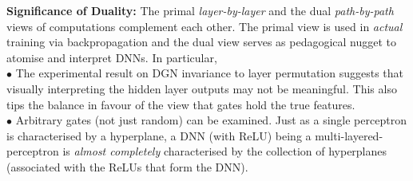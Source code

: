 \textbf{Significance of Duality:} The primal \emph{layer-by-layer} and the dual \emph{path-by-path} views of computations complement each other. The primal view is used in \emph{actual} training via backpropagation and the dual view serves as pedagogical nugget to atomise and interpret DNNs. In particular,\\
$\bullet$ The experimental result on DGN invariance to layer permutation suggests that visually interpreting the hidden layer outputs may not be meaningful. This also tips the balance in favour of the view that gates hold the true features.\\
$\bullet$ Arbitrary gates (not just random) can be examined. Just as a single perceptron is characterised by a hyperplane, a DNN (with ReLU) being a multi-layered-perceptron is \emph{almost completely} characterised by the collection of hyperplanes (associated with the ReLUs that form the DNN).
\begin{table}[h]
\caption{Primal-Dual Viewpoints. $\bm{\dagger}=$ novelties in this paper.}
\label{tb:primal-dual}
\end{table}

